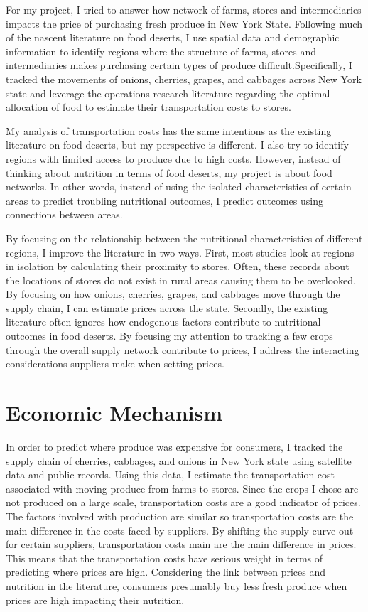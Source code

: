 \documentclass{report}
\begin{document}
For my project, I tried to answer how network of farms, stores and intermediaries impacts the price of purchasing fresh produce in New York State. Following much of the nascent literature on food deserts, I use spatial data and demographic information to identify regions where the structure of farms, stores and intermediaries makes purchasing certain types of produce difficult.Specifically, I tracked the movements of onions, cherries, grapes, and cabbages across New York state and leverage the operations research literature regarding the optimal allocation of food to estimate their transportation costs to stores. 

My analysis of transportation costs has the same intentions as the existing literature on food deserts, but my perspective is different. I also try to identify regions with limited access to produce due to high costs. However, instead of thinking about nutrition in terms of food deserts, my project is about food networks. In other words, instead of using the isolated characteristics of certain areas to predict troubling nutritional outcomes, I predict outcomes using connections between areas. 

By focusing on the relationship between the nutritional characteristics of different regions, I improve the literature in two ways. First, most studies look at regions in isolation by calculating their proximity to stores. Often, these records about the locations of stores do not exist in rural areas causing them to be overlooked. By focusing on how onions, cherries, grapes, and cabbages move through the supply chain, I can estimate prices across the state. Secondly, the existing literature often ignores how endogenous factors contribute to nutritional outcomes in food deserts. By focusing my attention to tracking a few crops through the overall supply network contribute to prices, I address the interacting considerations suppliers make when setting prices.

\section{Economic Mechanism}

In order to predict where produce was expensive for consumers, I tracked the supply chain of cherries, cabbages, and onions in New York state using satellite data and public records. Using this data, I estimate the transportation cost associated with moving produce from farms to stores. Since the crops I chose are not produced on a large scale, transportation costs are a good indicator of prices. The factors involved with production are similar so transportation costs are the main difference in the costs faced by suppliers. By shifting the supply curve out for certain suppliers, transportation costs main are the main difference in prices. This means that the transportation costs have serious weight in terms of predicting where prices are high. Considering the link between prices and nutrition in the literature, consumers presumably buy less fresh produce when prices are high impacting their nutrition.
\end{document}
